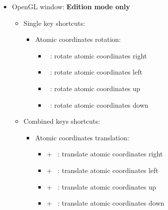 {\begin{itemize}
\begin{itemize}
\begin{itemize}
\begin{itemize}
\item[] \Ctrl +  : stop spinning 
\end{itemize}
\end{itemize}
\end{itemize}
\item OpenGL window: {\bf{Edition mode only}}
\begin{itemize}
\item Single key shortcuts: 
\begin{itemize}
\item Atomic coordinates rotation: 
\begin{itemize}
\item[] \RArrow\ : rotate atomic coordinates right
\item[] \LArrow\ : rotate atomic coordinates left
\item[] \UArrow\ : rotate atomic coordinates up
\item[] \DArrow\ : rotate atomic coordinates down
\end{itemize}
\end{itemize}
\item Combined keys shortcuts: 
\begin{itemize}
\item Atomic coordinates translation: 
\begin{itemize}
\item[] \Ctrl + \RArrow\ : translate atomic coordinates right
\item[] \Ctrl + \LArrow\ : translate atomic coordinates left
\item[] \Ctrl + \UArrow\ : translate atomic coordinates up
\item[] \Ctrl + \DArrow\ : translate atomic coordinates down
\end{itemize}
\end{itemize}
\end{itemize}
\end{itemize}}
